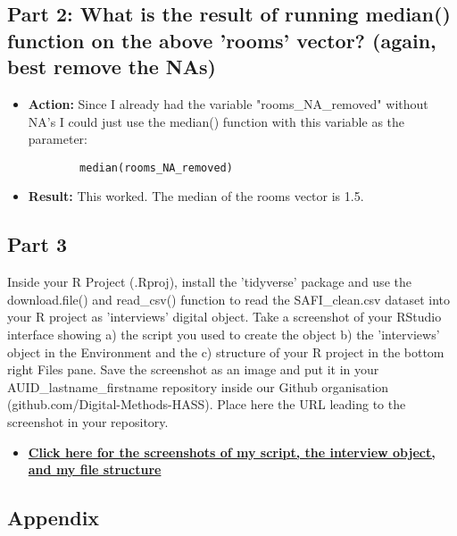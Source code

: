 \documentclass{article}
\begin{document}
\subsection{Part 2: What is the result of running median() function on the above 'rooms' vector? (again, best remove the NAs)}
\begin{itemize}
    \item \textbf{Action:} Since I already had the variable "rooms\_NA\_removed" without NA's I could just use the median() function with this variable as the parameter:
    \begin{verbatim}
        median(rooms_NA_removed)
    \end{verbatim}
    \item\textbf{Result:} This worked. The median of the rooms vector is 1.5.
\end{itemize}

\subsection{Part 3}
Inside your R Project (.Rproj), install the 'tidyverse' package and use the download.file() and read\_csv() function to read the SAFI\_clean.csv dataset into your R project as 'interviews' digital object.
Take a screenshot of your RStudio interface showing a) the script you used to create the object b) the 'interviews' object in the Environment and the c) structure of your R project in the bottom right Files pane.
Save the screenshot as an image and put it in your AUID\_lastname\_firstname repository inside our Github organisation (github.com/Digital-Methods-HASS). Place here the URL leading to the screenshot in your repository.

\begin{itemize}
    \item \href{https://github.com/Digital-Methods-HASS/au590388_Christoffer_Kramer/tree/master/learning_journal_and_assignments/week_41}{\textbf{Click here for the screenshots of my script, the interview object, and my file structure}}
\end{itemize}

\subsection{Appendix}
\end{document}
